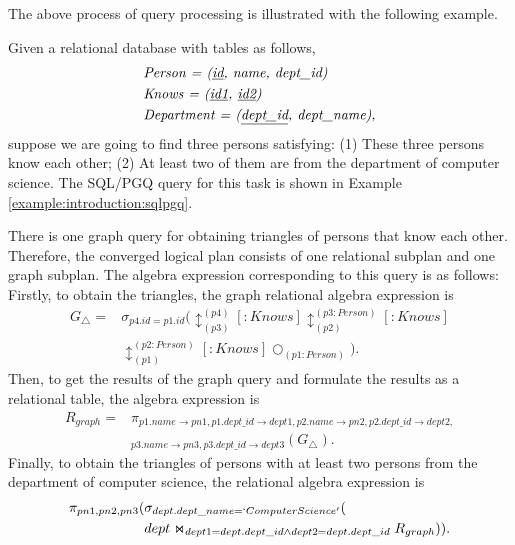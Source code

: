 The above process of query processing is illustrated with the following example.

\begin{example}
    Given a relational database with tables as follows,
    \begin{equation*}
        \begin{split}
            & \textit{Person = (\underline{id}, name, dept\_id)} \\
            & \textit{Knows = (\underline{id1}, \underline{id2})} \\
            & \textit{Department = (\underline{dept\_id}, dept\_name)}, \\
        \end{split}
    \end{equation*}
    suppose we are going to find three persons satisfying: 
    (1) These three persons know each other;
    (2) At least two of them are from the department of computer science.
    The SQL/PGQ query for this task is shown in Example \ref{example:introduction:sqlpgq}.      

    There is one graph query for obtaining triangles of persons that know each other.
    Therefore, the converged logical plan consists of one relational subplan and one graph subplan.
    The algebra expression corresponding to this query is as follows:
    Firstly, to obtain the triangles, the graph relational algebra expression is
    \begin{equation*}
        \begin{split}
            G_{\triangle} = & \sigma_{p4.id = p1.id}(\updownarrow_{(p3)}^{(p4)}[:Knows]\updownarrow_{(p2)}^{(p3:Person)}[:Knows] \\
            & \updownarrow_{(p1)}^{(p2:Person)}[:Knows]\bigcirc_{(p1:Person)}).
        \end{split}
    \end{equation*}
    Then, to get the results of the graph query and formulate the results as a relational table, the algebra expression is 
    \begin{equation*}
        \begin{split}
            R_{graph} = & \pi_{p1.name\rightarrow pn1, p1.dept\_id \rightarrow dept1,p2.name\rightarrow pn2, p2.dept\_id \rightarrow dept2,} \\
            & _{p3.name\rightarrow pn3, p3.dept\_id \rightarrow dept3}(G_{\triangle}).
        \end{split}
    \end{equation*}
    Finally, to obtain the triangles of persons with at least two persons from the department of computer science, the relational algebra expression is
    \begin{equation*}
        \begin{split}
        \pi_{pn1, pn2, pn3}
        (& \sigma_{dept.dept\_name = `Computer Science'}( \\ 
        & dept \Join_{dept1=dept.dept\_id \land dept2=dept.dept\_id} R_{graph})).
        \end{split}
    \end{equation*}


\end{example}
